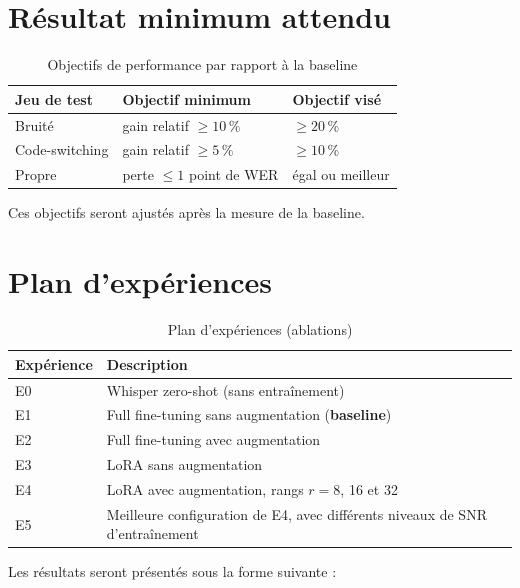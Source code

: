 \documentclass[12pt,a4paper]{report}
\begin{document}
\section{Résultat minimum attendu}
\begin{table}[h]
  \centering
  \small
  \begin{tabular}{lll}
    \toprule
    \textbf{Jeu de test} & \textbf{Objectif minimum} & \textbf{Objectif visé} \\
    \midrule
    Bruité          & gain relatif $\geq 10\,\%$ & $\geq 20\,\%$ \\
    Code-switching  & gain relatif $\geq 5\,\%$  & $\geq 10\,\%$ \\
    Propre          & perte $\leq 1$ point de WER & égal ou meilleur \\
    \bottomrule
  \end{tabular}
  \caption{Objectifs de performance par rapport à la baseline}
  \label{tab:objectifs}
\end{table}

Ces objectifs seront ajustés après la mesure de la baseline.

\section{Plan d'expériences}
\begin{table}[h]
  \centering
  \small
  \begin{tabularx}{\textwidth}{lX}
    \toprule
    \textbf{Expérience} & \textbf{Description} \\
    \midrule
    E0 & Whisper zero-shot (sans entraînement) \\
    E1 & Full fine-tuning sans augmentation (\textbf{baseline}) \\
    E2 & Full fine-tuning avec augmentation \\
    E3 & LoRA sans augmentation \\
    E4 & LoRA avec augmentation, rangs $r = 8$, 16 et 32 \\
    E5 & Meilleure configuration de E4, avec différents niveaux de SNR
         d'entraînement \\
    \bottomrule
  \end{tabularx}
  \caption{Plan d'expériences (ablations)}
  \label{tab:experiences}
\end{table}

Les résultats seront présentés sous la forme suivante :
\end{document}
